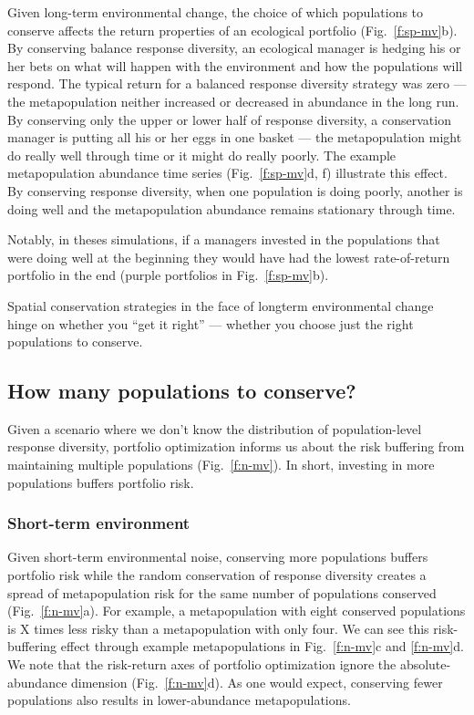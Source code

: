 Given long-term environmental change, the choice of which populations to conserve affects the return properties of an ecological portfolio (Fig.~\ref{f:sp-mv}b). By conserving balance response diversity, an ecological manager is hedging his or her bets on what will happen with the environment and how the populations will respond. The typical return for a balanced response diversity strategy was zero --- the metapopulation neither increased or decreased in abundance in the long run. By conserving only the upper or lower half of response diversity, a conservation manager is putting all his or her eggs in one basket --- the metapopulation might do really well through time or it might do really poorly. The example metapopulation abundance time series (Fig.~\ref{f:sp-mv}d, f) illustrate this effect. By conserving response diversity, when one population is doing poorly, another is doing well and the metapopulation abundance remains stationary through time.

Notably, in theses simulations, if a managers invested in the populations that were doing well at the beginning they would have had the lowest rate-of-return portfolio in the end (purple portfolios in Fig.~\ref{f:sp-mv}b).

Spatial conservation strategies in the face of longterm environmental change hinge on whether you ``get it right'' --- whether you choose just the right populations to conserve.

\subsection{How many populations to conserve?}

Given a scenario where we don't know the distribution of population-level response diversity, portfolio optimization informs us about the risk buffering from maintaining multiple populations (Fig.~\ref{f:n-mv}). In short, investing in more populations buffers portfolio risk.

\subsubsection{Short-term environment}

Given short-term environmental noise, conserving more populations buffers portfolio risk while the random conservation of response diversity creates a spread of metapopulation risk for the same number of populations conserved (Fig.~\ref{f:n-mv}a). For example, a metapopulation with eight conserved populations is X times less risky than a metapopulation with only four. We can see this risk-buffering effect through example metapopulations in Fig.~\ref{f:n-mv}c and \ref{f:n-mv}d. We note that the risk-return axes of portfolio optimization ignore the absolute-abundance dimension (Fig.~\ref{f:n-mv}d). As one would expect, conserving fewer populations also results in lower-abundance metapopulations.

